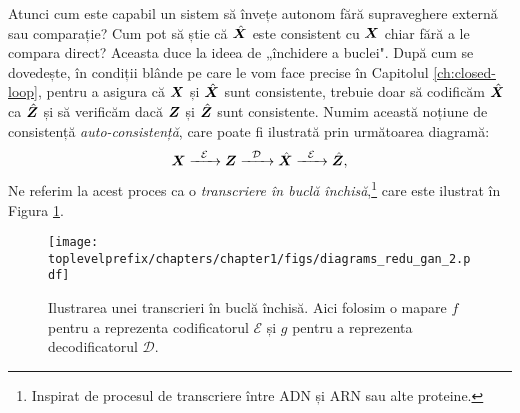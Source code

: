 \documentclass[../../book-main_ro.tex]{subfiles}
\begin{document}
Atunci cum este capabil un sistem să învețe autonom fără supraveghere externă sau comparație? Cum pot să știe că $\hat {\bm{X}}$ este consistent cu $\bm{X}$ chiar fără a le compara direct? Aceasta duce la ideea de „închidere a buclei". După cum se dovedește, în condiții blânde pe care le vom face precise în Capitolul \ref{ch:closed-loop}, pentru a asigura că $\bm{X}$ și $\hat {\bm{X}}$ sunt consistente, trebuie doar să codificăm $\hat {\bm{X}}$ ca $\hat {\bm{Z}}$ și să verificăm dacă $\bm{Z}$ și $\hat {\bm{Z}}$ sunt consistente. Numim această noțiune de consistență {\em auto-consistență}, care poate fi ilustrată prin următoarea diagramă:
\begin{equation}
    \bm{X}   \xrightarrow{\hspace{2mm} \mathcal{E}\hspace{2mm}} \bm{Z}  \xrightarrow{\hspace{2mm} \mathcal{D} \hspace{2mm}} \hat {\bm{X}} \xrightarrow{\hspace{2mm} \mathcal{E}\hspace{2mm}} \hat {\bm{Z}},
    \label{eqn:closed-loop}
\end{equation}
Ne referim la acest proces ca o {\em transcriere în buclă închisă},\footnote{Inspirat de procesul de transcriere între ADN și ARN sau alte proteine.} care este ilustrat în Figura \ref{fig:closed-loop}.

\begin{figure}[t]
    \centering
\texttt{[image: \\toplevelprefix/chapters/chapter1/figs/diagrams\_redu\_gan\_2.pdf]}
\caption{Ilustrarea unei transcrieri în buclă închisă. Aici folosim o mapare $f$ pentru a reprezenta codificatorul $\mathcal{E}$ și $g$ pentru a reprezenta decodificatorul $\mathcal{D}$.}  \label{fig:closed-loop}
\end{figure}
\end{document}

